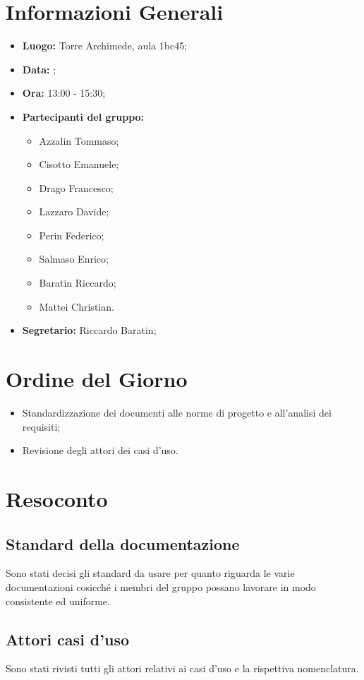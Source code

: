 \section{Informazioni Generali}
\begin{itemize}
\item \textbf{Luogo:} Torre Archimede, aula 1bc45;
\item \textbf{Data:} \Data;
\item \textbf{Ora:} 13:00 - 15:30;
\item \textbf{Partecipanti del gruppo:}
	\begin{itemize}
	\item Azzalin Tommaso; 
	\item Cisotto Emanuele; 
	\item Drago Francesco;
	\item Lazzaro Davide;
	\item Perin Federico;
	\item Salmaso Enrico;
	\item Baratin Riccardo;
	\item Mattei Christian.
	\end{itemize} 
\item \textbf{Segretario:} Riccardo Baratin;
\end{itemize}

\section{Ordine del Giorno}
\begin{itemize}
	\item Standardizzazione dei documenti alle norme di progetto e all'analisi dei requisiti;
	\item Revisione degli attori dei casi d'uso.
	
\end{itemize}


\section{Resoconto}
\subsection{Standard della documentazione}
Sono stati decisi gli standard da usare per quanto riguarda le varie documentazioni cosicché i membri del gruppo possano lavorare in modo consistente ed uniforme. \\

\subsection{Attori casi d'uso}
Sono stati rivisti tutti gli attori relativi ai casi d'uso e la rispettiva nomenclatura. \\

\clearpage